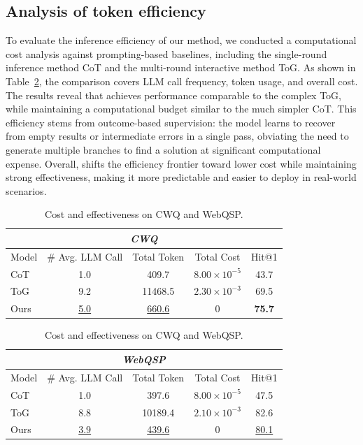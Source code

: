 \subsection{Analysis of token efficiency}
To evaluate the inference efficiency of our method, we conducted a computational cost analysis against prompting-based baselines, including the single-round inference method CoT and the multi-round interactive method ToG. As shown in Table~\ref{tab:cost_hit}, the comparison covers LLM call frequency, token usage, and overall cost. The results reveal that \ours \space achieves performance comparable to the complex ToG, while maintaining a computational budget similar to the much simpler CoT. This efficiency stems from outcome-based supervision: the model learns to recover from empty results or intermediate errors in a single pass, obviating the need to generate multiple branches to find a solution at significant computational expense. Overall, \ours \space shifts the efficiency frontier toward lower cost while maintaining strong effectiveness, making it more predictable and easier to deploy in real-world scenarios.
\begin{table}[ht]
  \centering
  \small
  \caption{Cost and effectiveness on CWQ and WebQSP.}
  \label{tab:cost_hit}

  \begin{tabular}{lcccc}
    \toprule
    \multicolumn{5}{c}{\textit{CWQ}} \\
    \midrule
    Model & \# Avg. LLM Call & Total Token & Total Cost & Hit@1 \\
    \midrule
    CoT  & 1.0 & 409.7   & \(8.00\times10^{-5}\) & 43.7 \\
    ToG  & 9.2 & 11468.5 & \(2.30\times10^{-3}\) & 69.5 \\
    Ours & \underline{5.0} & \underline{660.6} & \textbf{\(0\)} & \textbf{75.7} \\
    \bottomrule
  \end{tabular}

  \begin{tabular}{lcccc}
    \toprule
    \multicolumn{5}{c}{\textit{WebQSP}} \\
    \midrule
    Model & \# Avg. LLM Call & Total Token & Total Cost & Hit@1 \\
    \midrule
    CoT  & 1.0 & 397.6   & \(8.00\times10^{-5}\) & 47.5 \\
    ToG  & 8.8 & 10189.4 & \(2.10\times10^{-3}\) & 82.6 \\
    Ours & \underline{3.9} & \underline{439.6} & \textbf{\(0\)} & \underline{80.1} \\
    \bottomrule
  \end{tabular}
\end{table}
